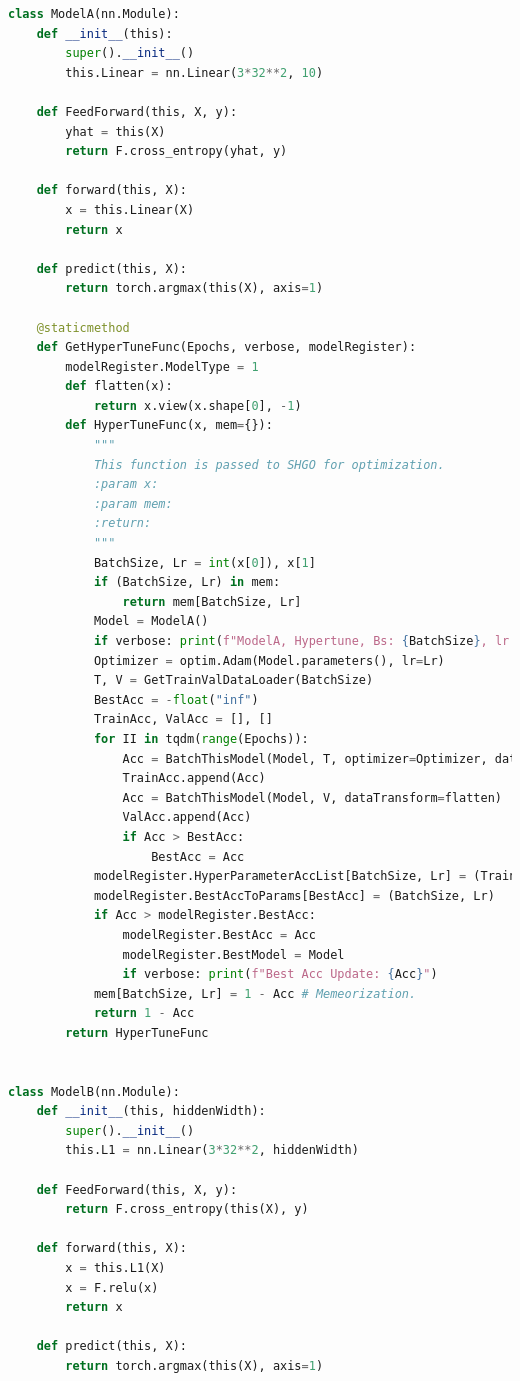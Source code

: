 \documentclass[]{article}
\begin{document}
\begin{lstlisting}[language=python]
class ModelA(nn.Module):
    def __init__(this):
        super().__init__()
        this.Linear = nn.Linear(3*32**2, 10)

    def FeedForward(this, X, y):
        yhat = this(X)
        return F.cross_entropy(yhat, y)

    def forward(this, X):
        x = this.Linear(X)
        return x

    def predict(this, X):
        return torch.argmax(this(X), axis=1)

    @staticmethod
    def GetHyperTuneFunc(Epochs, verbose, modelRegister):
        modelRegister.ModelType = 1
        def flatten(x):
            return x.view(x.shape[0], -1)
        def HyperTuneFunc(x, mem={}):
            """
            This function is passed to SHGO for optimization.
            :param x:
            :param mem:
            :return:
            """
            BatchSize, Lr = int(x[0]), x[1]
            if (BatchSize, Lr) in mem:
                return mem[BatchSize, Lr]
            Model = ModelA()
            if verbose: print(f"ModelA, Hypertune, Bs: {BatchSize}, lr: {Lr}")
            Optimizer = optim.Adam(Model.parameters(), lr=Lr)
            T, V = GetTrainValDataLoader(BatchSize)
            BestAcc = -float("inf")
            TrainAcc, ValAcc = [], []
            for II in tqdm(range(Epochs)):
                Acc = BatchThisModel(Model, T, optimizer=Optimizer, dataTransform=flatten)
                TrainAcc.append(Acc)
                Acc = BatchThisModel(Model, V, dataTransform=flatten)
                ValAcc.append(Acc)
                if Acc > BestAcc:
                    BestAcc = Acc
            modelRegister.HyperParameterAccList[BatchSize, Lr] = (TrainAcc, ValAcc)
            modelRegister.BestAccToParams[BestAcc] = (BatchSize, Lr)
            if Acc > modelRegister.BestAcc:
                modelRegister.BestAcc = Acc
                modelRegister.BestModel = Model
                if verbose: print(f"Best Acc Update: {Acc}")
            mem[BatchSize, Lr] = 1 - Acc # Memeorization.
            return 1 - Acc
        return HyperTuneFunc


class ModelB(nn.Module):
    def __init__(this, hiddenWidth):
        super().__init__()
        this.L1 = nn.Linear(3*32**2, hiddenWidth)

    def FeedForward(this, X, y):
        return F.cross_entropy(this(X), y)

    def forward(this, X):
        x = this.L1(X)
        x = F.relu(x)
        return x

    def predict(this, X):
        return torch.argmax(this(X), axis=1)


\end{lstlisting}
\end{document}
